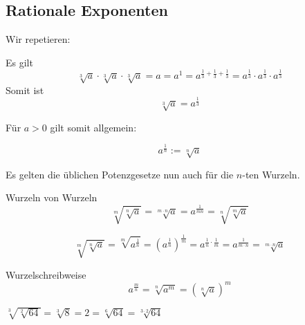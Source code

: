 \newpage


\subsection{Rationale Exponenten}

Wir repetieren:



\begin{beispiel}{}{}
 Es gilt
 $$\sqrt[3]{a} \cdot{}\sqrt[3]{a} \cdot{}\sqrt[3]{a} = a = a^1 = a^{\frac13 +\frac13 +\frac13} = a^\frac13 \cdot{} a^\frac13 \cdot{}a^\frac13$$
 Somit ist
 $$\sqrt[3]{a} = a^\frac13$$
\end{beispiel}

Für $a > 0$ gilt somit allgemein:

\begin{definition}{}{}
  $$a^{\frac{1}{n}} := \sqrt[n]{a}$$
\end{definition}


 Es gelten die üblichen Potenzgesetze nun auch für die $n$-ten Wurzeln.


\begin{gesetz}{Wurzeln von Wurzeln}{}
  $$\sqrt[m]{\sqrt[n]{a}} = \sqrt[m\cdot n]{a}=a^\frac1{mn} = \sqrt[n]{\sqrt[m]{a}}$$
\end{gesetz}

$$\sqrt[m]{\sqrt[n]{a}} = \sqrt[m]{a^\frac{1}{n}} = (a^{\frac{1}{n}})^{\frac{1}{m}} = a^{\frac{1}{n}\cdot\frac{1}{m}} = a^{\frac{1}{m\cdot n}} = \sqrt[m\cdot n]{a}$$

\begin{gesetz}{Wurzelschreibweise}{}
  $$a^\frac{m}n = \sqrt[n]{a^m} = \left(\sqrt[n]{a}\right)^m$$
\end{gesetz}
\newpage


\begin{beispiel}{}{}
 $\sqrt[3]{\sqrt[2]{64}} = \sqrt[3]{8} = 2 = \sqrt[6]{64} = \sqrt[3\cdot2]{64}$
\end{beispiel}


